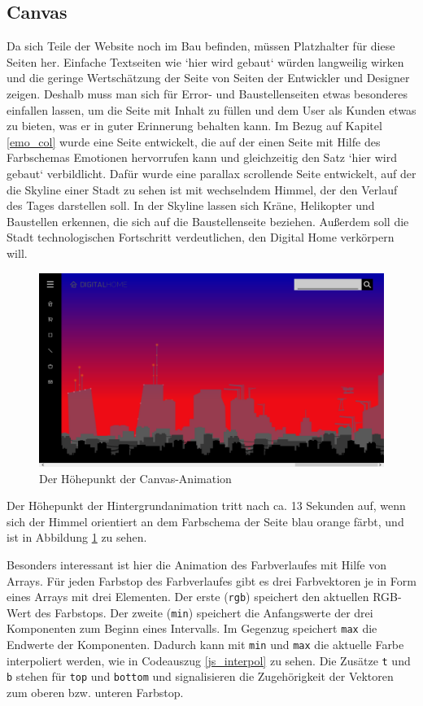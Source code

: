 \subsection{Canvas}

Da sich Teile der Website noch im Bau befinden, müssen Platzhalter für diese Seiten her. Einfache Textseiten wie `hier wird gebaut` würden langweilig wirken und die geringe Wertschätzung der Seite von Seiten der Entwickler und Designer zeigen. Deshalb muss man sich für Error- und Baustellenseiten etwas besonderes einfallen lassen, um die Seite mit Inhalt zu füllen und dem User als Kunden etwas zu bieten, was er in guter Erinnerung behalten kann. Im Bezug auf Kapitel \ref{emo_col} wurde eine Seite entwickelt, die auf der einen Seite mit Hilfe des Farbschemas Emotionen hervorrufen kann und gleichzeitig den Satz `hier wird gebaut` verbildlicht. Dafür wurde eine parallax scrollende Seite entwickelt, auf der die Skyline einer Stadt zu sehen ist mit wechselndem Himmel, der den Verlauf des Tages darstellen soll. In der Skyline lassen sich Kräne, Helikopter und Baustellen erkennen, die sich auf die Baustellenseite beziehen. Außerdem soll die Stadt technologischen Fortschritt verdeutlichen, den Digital Home verkörpern will.
\begin{figure} [h]
\includegraphics[width=\textwidth]{./img/js_canvas_highlight.png}
\caption{Der Höhepunkt der Canvas-Animation}
\label{js_canvas_highlight}
\end{figure}
Der Höhepunkt der Hintergrundanimation tritt nach ca. 13 Sekunden auf, wenn sich der Himmel orientiert an dem Farbschema der Seite blau orange färbt, und ist in Abbildung \ref{js_canvas_highlight} zu sehen.

Besonders interessant ist hier die Animation des Farbverlaufes mit Hilfe von Arrays. Für jeden Farbstop des Farbverlaufes gibt es drei Farbvektoren je in Form eines Arrays mit drei Elementen. Der erste (\lstinline{rgb}) speichert den aktuellen RGB-Wert des Farbstops. Der zweite (\lstinline{min}) speichert die Anfangswerte der drei Komponenten zum Beginn eines Intervalls. Im Gegenzug speichert \lstinline{max} die Endwerte der Komponenten. Dadurch kann mit \lstinline{min} und \lstinline{max} die aktuelle Farbe interpoliert werden, wie in Codeauszug \ref{js_interpol} zu sehen. Die Zusätze \lstinline{t} und \lstinline{b} stehen für \lstinline{top} und \lstinline{bottom} und signalisieren die Zugehörigkeit der Vektoren zum oberen bzw. unteren Farbstop.

